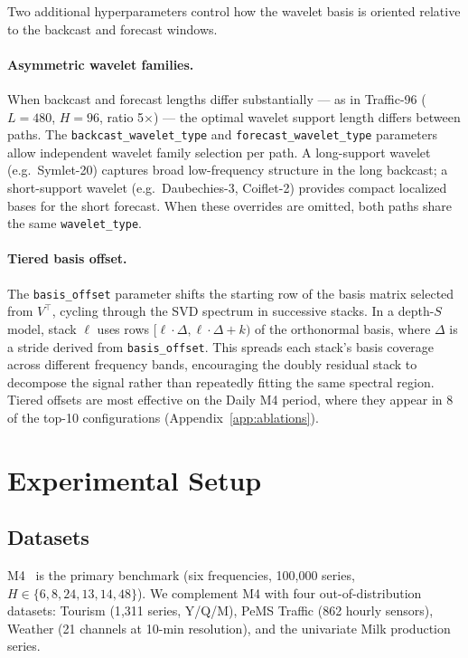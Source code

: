 \documentclass{article}
\begin{document}
Two additional hyperparameters control how the wavelet basis is oriented relative to the backcast and forecast windows.

\paragraph{Asymmetric wavelet families.} When backcast and forecast lengths differ substantially --- as in Traffic-96 ($L=480$, $H=96$, ratio 5$\times$) --- the optimal wavelet support length differs between paths. The \texttt{backcast\_wavelet\_type} and \texttt{forecast\_wavelet\_type} parameters allow independent wavelet family selection per path. A long-support wavelet (e.g.\ Symlet-20) captures broad low-frequency structure in the long backcast; a short-support wavelet (e.g.\ Daubechies-3, Coiflet-2) provides compact localized bases for the short forecast. When these overrides are omitted, both paths share the same \texttt{wavelet\_type}.

\paragraph{Tiered basis offset.} The \texttt{basis\_offset} parameter shifts the starting row of the basis matrix selected from $V^\top$, cycling through the SVD spectrum in successive stacks. In a depth-$S$ model, stack $\ell$ uses rows $[\ell \cdot \Delta, \ell \cdot \Delta + k)$ of the orthonormal basis, where $\Delta$ is a stride derived from \texttt{basis\_offset}. This spreads each stack's basis coverage across different frequency bands, encouraging the doubly residual stack to decompose the signal rather than repeatedly fitting the same spectral region. Tiered offsets are most effective on the Daily M4 period, where they appear in 8 of the top-10 configurations (Appendix~\ref{app:ablations}).


\section{Experimental Setup}
\label{sec:experimental_setup}

\subsection{Datasets}

M4~\citep{makridakis2020m4} is the primary benchmark (six frequencies, 100{,}000 series, $H \in \{6, 8, 24, 13, 14, 48\}$). We complement M4 with four out-of-distribution datasets: Tourism (1{,}311 series, Y/Q/M), PeMS Traffic (862 hourly sensors), Weather (21 channels at 10-min resolution), and the univariate Milk production series.
\end{document}
